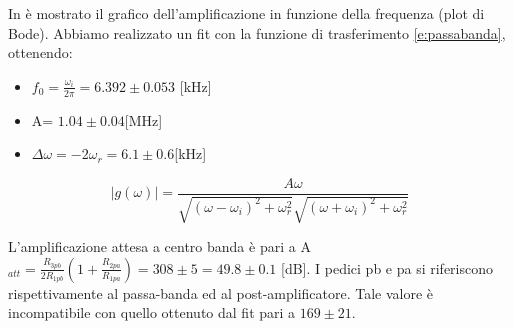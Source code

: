 In  è mostrato il grafico dell'amplificazione in funzione della frequenza (plot di Bode). Abbiamo realizzato un fit con la funzione di trasferimento \ref{e:passabanda}, ottenendo:
\begin{itemize}
\item $f_0=\frac{\omega_i}{2\pi}= 6.392 \pm 0.053$ [kHz]
\item A= $1.04 \pm 0.04$[MHz]
\item $\Delta \omega =-2\omega_r= 6.1 \pm 0.6$[kHz]
\end{itemize}

\begin{equation}
|g(\omega)| = \frac{A\omega}{ \sqrt{(\omega-\omega_i)^2 + \omega_r^2} \sqrt{(\omega+\omega_i)^2 + \omega_r^2}}
\label{e:passabanda}
\end{equation}

L'amplificazione attesa a centro banda è pari a A$_{att} = \frac{R_{3pb}}{2R_{1pb}} (1+\frac{R_{2pa}}{R_{1pa}}) = 308 \pm 5 = 49.8 \pm 0.1$ [dB]. I pedici pb e pa si riferiscono rispettivamente al passa-banda ed al post-amplificatore. Tale valore è incompatibile con quello ottenuto dal fit pari a $169 \pm 21$.